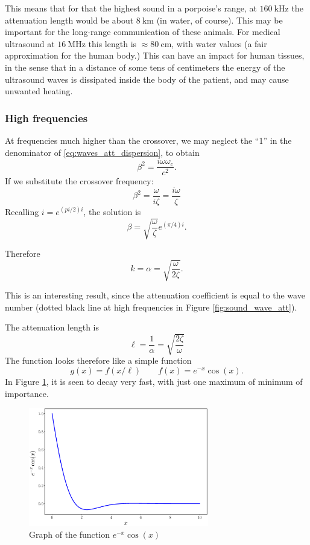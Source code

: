 This means that for that the highest sound in a porpoise's range, at
$\SI{160}{\kilo\hertz}$ the attenuation length would be about
$\SI{8}{\kilo\meter}$ (in water, of course). This may be important for
the long-range communication of these animals. For medical ultrasound
at $\SI{16}{\mega\hertz}$ this length is
$\approx\SI{80}{\centi\meter}$, with water values (a fair
approximation for the human body.) This can have an impact for human
tissues, in the sense that in a distance of some tens of centimeters
the energy of the ultrasound waves is dissipated inside the body of
the patient, and may cause unwanted heating.

\subsubsection{High frequencies}

At frequencies much higher than the crossover, we may neglect the
``1'' in the denominator of \ref{eq:waves_att_dispersion}, to obtain
\[
\beta^2 = \frac{i \omega\omega_\mathrm{c}}{c^2} .
\]
If we substitute the crossover frequency:
\[
\beta^2 = \frac{\omega}{i \zeta} =\frac{i \omega}{\zeta} 
\]
Recalling $i = e^{(pi/2)i} $, the solution is
\[
\beta =\sqrt{ \frac{\omega}{ \zeta }} e^{(\pi/4)i}.
\]

Therefore
\[
k=\alpha =\sqrt{\frac{\omega}{ 2 \zeta}}.
\]

This is an interesting result, since the attenuation coefficient is
equal to the wave number (dotted black line at high frequencies in
Figure \ref{fig:sound_wave_att}).

The attenuation length is
\[
\ell= \frac{1}{\alpha}=\sqrt{\frac{ 2 \zeta}{\omega}}
\]
The function looks therefore like a simple function
\[
g(x)= f(x/\ell) \qquad  f(x) = e^{-x}\cos(x) .
\]
In Figure \ref{fig:expcos}, it is seen to decay very fast, with just
one maximum of minimum of importance.

\begin{figure}
  \begin{center}
    \includegraphics[width=0.7\textwidth]{figures/expcos}
  \end{center}
  \caption{Graph of the function $e^{-x}\cos(x)$ \label{fig:expcos}}
\end{figure}
 



